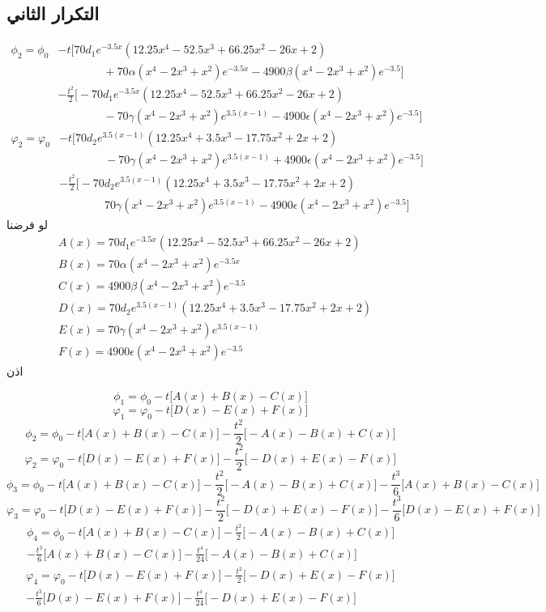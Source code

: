 \subsection*{التكرار الثاني}
\[
\begin{split}
	\phi_2 = \phi_0& - t\Big[70d_1 e^{-3.5x} (12.25x^4 - 52.5x^3 + 66.25x^2 - 26x + 2)\\
&\phantom{===}+70\alpha(x^4-2x^3+x^2)e^{-3.5x} - 4900\beta(x^4 - 2x^3 + x^2) e^{-3.5}\Big]\\
&- \frac{t^2}{2}\Big[-70d_1 e^{-3.5x} (12.25x^4 - 52.5x^3 + 66.25x^2 - 26x + 2)\\
&\phantom{===}-70\gamma(x^4-2x^3+x^2)e^{3.5(x-1)} - 4900\epsilon(x^4 - 2x^3 + x^2) e^{-3.5}
\Big]
\end{split}
\]
\[
\begin{split}
	\varphi_2 = \varphi_0&- t\Big[70d_2 e^{3.5(x-1)} (12.25x^4 + 3.5x^3 - 17.75x^2+2x+2)\\
	&\phantom{===} - 70\gamma(x^4-2x^3+x^2)e^{3.5(x-1)} + 4900\epsilon(x^4 - 2x^3 + x^2) e^{-3.5}\Big]\\
	&- \frac{t^2}{2} \Big[-70d_2 e^{3.5(x-1)} (12.25x^4 + 3.5x^3 - 17.75x^2+2x+2)\\
	&\phantom{===}70\gamma(x^4-2x^3+x^2)e^{3.5(x-1)} - 4900\epsilon(x^4 - 2x^3 + x^2) e^{-3.5}
	\Big] 
\end{split}
\]
\newpage
لو فرضنا
\begin{align*}
	& A(x) = 70d_1 e^{-3.5x} (12.25x^4 - 52.5x^3 + 66.25x^2 - 26x + 2)\\
	&B(x) = 70\alpha(x^4-2x^3+x^2)e^{-3.5x}\\
	&C(x) = 4900\beta(x^4 - 2x^3 + x^2) e^{-3.5}\\[10pt]
	&D(x) = 70d_2 e^{3.5(x-1)} (12.25x^4 + 3.5x^3 - 17.75x^2+2x+2)\\
	& E(x) = 70\gamma(x^4-2x^3+x^2)e^{3.5(x-1)}\\
	& F(x) = 4900\epsilon(x^4 - 2x^3 + x^2) e^{-3.5}
\end{align*}
اذن

\[
\phi_1 = \phi_0 - t\Big[A(x) + B(x) - C(x)\Big]
\]
\[
\varphi_{1} = \varphi_0 - t\Big[D(x)- E(x) + F(x)\Big]
\]
\[
\phi_2 = \phi_0 - t\Big[A(x) + B(x) - C(x)\Big] - \frac{t^2}{2} \Big[-A(x) - B(x) + C(x)\Big]
\]
\[
\varphi_2 = \varphi_0 - t\Big[D(x)- E(x) + F(x)\Big] - \frac{t^2}{2}\Big[-D(x) + E(x) - F(x)\Big]
\]
\[
\phi_3 = \phi_0 - t\Big[A(x) + B(x) - C(x)\Big] - \frac{t^2}{2} \Big[-A(x) - B(x) + C(x)\Big] - \frac{t^3}{6}\Big[A(x) + B(x) - C(x)\Big]
\]
\[
\varphi_3 = \varphi_0 - t\Big[D(x)- E(x) + F(x)\Big] - \frac{t^2}{2}\Big[-D(x) + E(x) - F(x)\Big] - \frac{t^3}{6}\Big[D(x) - E(x) + F(x)\Big]
\]
\[
\begin{split}
	\phi_4 = \phi_0 
	- t\Big[A(x) + B(x) - C(x)\Big] 
	- \frac{t^2}{2} \Big[-A(x) - B(x) + C(x)\Big] \\
	- \frac{t^3}{6}\Big[A(x) + B(x) - C(x)\Big]
	- \frac{t^4}{24}\Big[-A(x) - B(x) + C(x)\Big]
\end{split}
\] 
\[
\begin{split}
	\varphi_4 = \varphi_0 
	- t\Big[D(x)- E(x) + F(x)\Big] 
	- \frac{t^2}{2}\Big[-D(x) + E(x) - F(x)\Big]\\ 
	- \frac{t^3}{6}\Big[D(x) - E(x) + F(x)\Big]
	- \frac{t^4}{24}\Big[-D(x) + E(x) - F(x)\Big]
\end{split}
\]
